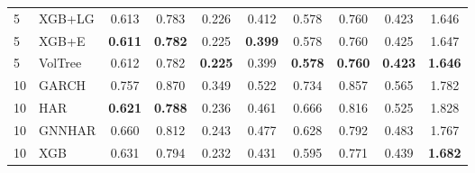 \documentclass[runningheads]{llncs}
\begin{document}
\begin{table}[t]
\begin{tabular}{ll cccc cccc}
5 & XGB+LG   & 0.613 & 0.783 & 0.226 & 0.412 & 0.578 & 0.760 & 0.423 & 1.646 \\ %
5 & XGB+E    & \textbf{0.611} & \textbf{0.782} & 0.225 & \textbf{0.399} & 0.578 & 0.760 & 0.425 & 1.647 \\ %
5 & VolTree & 0.612 & 0.782 & \textbf{0.225} & 0.399 & \textbf{0.578} & \textbf{0.760} & \textbf{0.423} & \textbf{1.646} \\ %
\midrule
10 & GARCH    & 0.757 & 0.870 & 0.349 & 0.522 & 0.734 & 0.857 & 0.565 & 1.782 \\ %
10 & HAR      & \textbf{0.621} & \textbf{0.788} & 0.236 & 0.461 & 0.666 & 0.816 & 0.525 & 1.828 \\ %
10 & GNNHAR   & 0.660 & 0.812 & 0.243 & 0.477 & 0.628 & 0.792 & 0.483 & 1.767 \\ %
10 & XGB      & 0.631 & 0.794 & 0.232 & 0.431 & 0.595 & 0.771 & 0.439 & \textbf{1.682} \\ %

\end{tabular}
\end{table}
\end{document}
